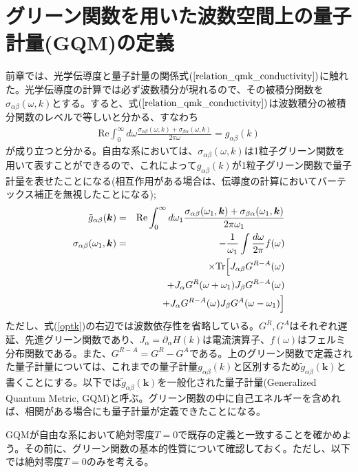 \documentclass[12pt]{jsbook}
\newcommand{\pa}{\partial}
\newcommand{\bk}{\bm{k}}
\begin{document}
\section{グリーン関数を用いた波数空間上の量子計量(GQM)の定義}
前章では、光学伝導度と量子計量の関係式$(\ref{relation_qmk_conductivity})$に触れた。光学伝導度の計算では必ず波数積分が現れるので、その被積分関数を$\sigma_{\alpha\beta}(\omega,k)$とする。すると、式$(\ref{relation_qmk_conductivity})$は波数積分の被積分関数のレベルで等しいと分かる、すなわち
\begin{eqnarray}
    \mathrm{Re} \int_0^{\infty}d\omega \frac{\sigma_{\alpha\beta}(\omega,k)+\sigma_{\beta\alpha}(\omega,k)}{2\pi\omega}=g_{\alpha\beta}(k)
\end{eqnarray}
が成り立つと分かる。自由な系においては、$\sigma_{\alpha\beta}(\omega,k)$は1粒子グリーン関数を用いて表すことができる\cite{michishita2021effects}ので、これによって$g_{\alpha\beta}(k)$が1粒子グリーン関数で量子計量を表せたことになる(相互作用がある場合は、伝導度の計算においてバーテックス補正を無視したことになる);
\begin{eqnarray}
\label{defGQM}\tilde{g}_{\alpha\beta}(\bk)&=&\mathrm{Re}\int_0^{\infty} d\omega_1 \frac{\sigma_{\alpha\beta}(\omega_1,\bk) + \sigma_{\beta{\alpha}}(\omega_1,\bk)}{2\pi\omega_1}\\
\label{optk}\sigma_{\alpha\beta}(\omega_1,\bk)&=&-\frac{1}{\omega_1}\int \frac{d\omega}{2\pi}f(\omega)\nonumber\\
&&\times \mathrm{Tr}\Bigl[J_{\alpha\beta}G^{R-A}(\omega)\nonumber\\
&& \ \ \ \ \ \ +J_\alpha G^R(\omega+\omega_1)J_\beta G^{R-A}(\omega)\nonumber\\ 
&& \ \ \ \ \ \ +J_\alpha G^{R-A}(\omega)J_\beta G^A(\omega-\omega_1)\Bigr]
\end{eqnarray}
ただし、式(\ref{optk})の右辺では波数依存性を省略している。$G^R,G^A$はそれぞれ遅延、先進グリーン関数であり、$J_\alpha=\pa_{\alpha} H(k)$は電流演算子、$f(\omega)$はフェルミ分布関数である。また、$G^{R-A}=G^R-G^A$である。上のグリーン関数で定義された量子計量については、これまでの量子計量$g_{\alpha\beta}(k)$と区別するため$\tilde{g}_{\alpha\beta}(\bk)$と書くことにする。以下では$\tilde{g}_{\alpha\beta}(\bk)$を一般化された量子計量(Generalized Quantum Metric, GQM)と呼ぶ。グリーン関数の中に自己エネルギーを含めれば、相関がある場合にも量子計量が定義できたことになる。

GQMが自由な系において絶対零度$T=0$で既存の定義と一致することを確かめよう。その前に、グリーン関数の基本的性質について確認しておく。ただし、以下では絶対零度$T=0$のみを考える。
\end{document}
